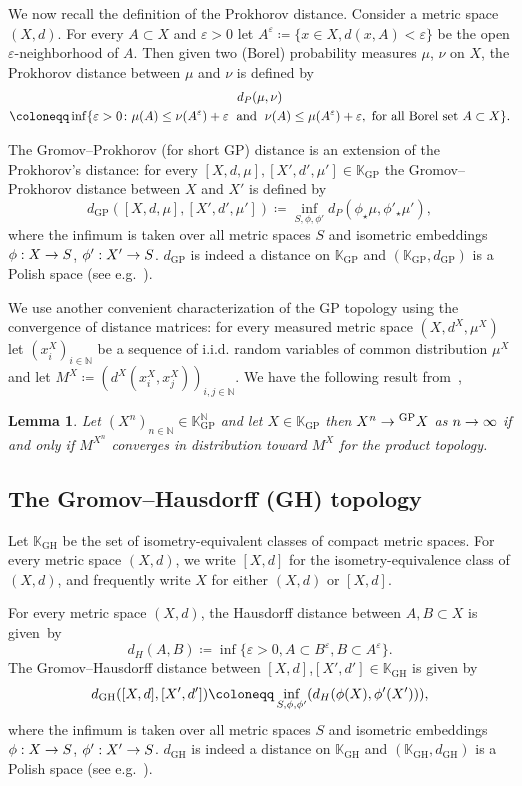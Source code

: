 \documentclass[10pt]{amsart}
\newtheorem{lemm}[theo]{Lemma}\newtheorem{prop}[theo]{Proposition}\newtheorem{coro}[theo]{Corollary}\newtheorem{conj}[theo]{Conjecture}
\theoremstyle{definition}\newtheorem{defi}[theo]{Definition}\newtheorem{rema}[theo]{Remark}\newtheorem{exam}[theo]{Example}\newtheorem{exem}[theo]{Example}\newtheorem{nota}[theo]{Notation}
\newcommand{\e}{\varepsilon}
\DeclareMathOperator{\GH}{GH}
\DeclareMathOperator{\GP}{GP}
\newcommand{\K}{\mathbb{K}}
\newcommand{\N}{\mathbb{N}}
\newcommand{\1}{\mathbbm{1}}
\let\originalleft\left
\let\originalright\right
\renewcommand{\left}{\mathopen{}\mathclose\bgroup\originalleft}
\renewcommand{\right}{\aftergroup\egroup\originalright}
\renewcommand*{\to}{\mathchoice{\longrightarrow}{\rightarrow}{\rightarrow}{\rightarrow}}
\begin{document}
We now recall the definition of the Prokhorov distance. Consider a metric space $(X,d)$. For every $A\subset X$ and $\e>0$ let $A^\e\coloneqq \{x\in X, d(x,A)<\e\}$ be the open $\varepsilon$-neighborhood of $A$. Then given two (Borel) probability measures $\mu$, $\nu$ on $X$, the Prokhorov distance between $\mu$ and $\nu$ is defined by
\begin{multline*}
d_P(\mu, \nu)\\
\coloneqq \inf\left\{ \e>0\colon \mu(A)\leq \nu (A^\e)+\e\;\text{ and }\;\nu(A)\leq \mu(A^\e)+\e, \text{ for all Borel set }A\subset X \right\}.
\end{multline*}

The Gromov--Prokhorov (for short GP) distance is an extension of the Prokhorov's distance: for every $[X,d,\mu],[X',d',\mu']\in \K_{\GP}$ the Gromov--Prokhorov distance between $X$ and $X'$ is defined by
\[
d_{\GP}([X,d,\mu],[X',d',\mu'])\coloneqq\inf_{S,\phi,\phi'} d_P(\phi_\star \mu, \phi'_\star\mu'),
\]
where the infimum is taken over all metric spaces $S$ and isometric embeddings $\phi :X\to S$, $\phi' :X'\to S$. $d_{\GP}$ is indeed a distance on $\K_{\GP}$ and $(\K_{\GP},d_{\GP})$ is a Polish space (see e.g.~\cite{ADH13}).

We use another convenient characterization of the GP topology using the convergence of distance matrices: for every measured metric space $(X,d^X,\mu^X)$ let $(x_i^X)_{i\in \N}$ be a sequence of i.i.d. random variables of common distribution $\mu^X$ and let $M^X\coloneqq(d^X(x_i^X,x_j^X))_{i,j\in \N}$. We have the following result from~\cite{Loh13},

\begin{lemm}\label{equivGP}
Let $(X^n)_{n\in \N} \in \K_{\GP}^\N$ and let $X\in \K_{\GP}$ then $X^n\to^{\GP}X$ as $n\to \infty$ if and only if $M^{X^n}$ converges in distribution toward $M^X$ for the product topology.
\end{lemm}

\subsection{The Gromov--Hausdorff (GH) topology} \label{GH}
Let $\K_{\GH}$ be the set of isometry-equivalent classes of compact metric spaces. For every metric space $(X,d)$, we write $[X,d]$ for the isometry-equivalence class of $(X,d)$, and frequently write $X$ for either $(X,d)$ or $[X,d]$.

For every metric space $(X,d)$, the Hausdorff distance between $A,B\subset X$ is given~by
\[
d_H(A,B)\coloneqq \inf\{\e>0, A\subset B^\e, B\subset A^\e \}.
\]
The Gromov--Hausdorff distance between $[X,d]$,$[X',d']\in \K_{\GH}$ is given by
\[
d_{\GH}([X,d],[X',d'])\coloneqq\inf_{S,\phi,\phi'} \left (d_H(\phi(X), \phi'(X')) \right),
\]
where the infimum is taken over all metric spaces $S$ and isometric embeddings $\phi :X\to S$, $\phi' :X'\to S$. $d_{\GH}$ is indeed a distance on $\K_{\GH}$ and $(\K_{\GH},d_{\GH})$ is a Polish space (see e.g.~\cite{ADH13}).
\end{document}
